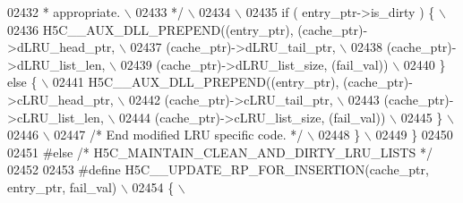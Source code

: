 \begin{DoxyCode}
02432 \textcolor{comment}{         * appropriate.                                                    \(\backslash\)}
02433 \textcolor{comment}{         */}\textcolor{preprocessor}{                                                                \(\backslash\)}
02434 \textcolor{preprocessor}{                                                                           \(\backslash\)}
02435 \textcolor{preprocessor}{        if ( entry\_ptr->is\_dirty ) \{                                       \(\backslash\)}
02436 \textcolor{preprocessor}{            H5C\_\_AUX\_DLL\_PREPEND((entry\_ptr), (cache\_ptr)->dLRU\_head\_ptr,  \(\backslash\)}
02437 \textcolor{preprocessor}{                                 (cache\_ptr)->dLRU\_tail\_ptr,               \(\backslash\)}
02438 \textcolor{preprocessor}{                                 (cache\_ptr)->dLRU\_list\_len,               \(\backslash\)}
02439 \textcolor{preprocessor}{                                 (cache\_ptr)->dLRU\_list\_size, (fail\_val))  \(\backslash\)}
02440 \textcolor{preprocessor}{        \} else \{                                                           \(\backslash\)}
02441 \textcolor{preprocessor}{            H5C\_\_AUX\_DLL\_PREPEND((entry\_ptr), (cache\_ptr)->cLRU\_head\_ptr,  \(\backslash\)}
02442 \textcolor{preprocessor}{                                 (cache\_ptr)->cLRU\_tail\_ptr,               \(\backslash\)}
02443 \textcolor{preprocessor}{                                 (cache\_ptr)->cLRU\_list\_len,               \(\backslash\)}
02444 \textcolor{preprocessor}{                                 (cache\_ptr)->cLRU\_list\_size, (fail\_val))  \(\backslash\)}
02445 \textcolor{preprocessor}{        \}                                                                  \(\backslash\)}
02446 \textcolor{preprocessor}{                                                                           \(\backslash\)}
02447 \textcolor{preprocessor}{        }\textcolor{comment}{/* End modified LRU specific code. */}\textcolor{preprocessor}{                              \(\backslash\)}
02448 \textcolor{preprocessor}{    \}                                                                      \(\backslash\)}
02449 \textcolor{preprocessor}{\}}
02450 
02451 \textcolor{preprocessor}{#else }\textcolor{comment}{/* H5C\_MAINTAIN\_CLEAN\_AND\_DIRTY\_LRU\_LISTS */}\textcolor{preprocessor}{}
02452 
02453 \textcolor{preprocessor}{#define H5C\_\_UPDATE\_RP\_FOR\_INSERTION(cache\_ptr, entry\_ptr, fail\_val)       \(\backslash\)}
02454 \textcolor{preprocessor}{\{                                                                          \(\backslash\)}

\end{DoxyCode}
